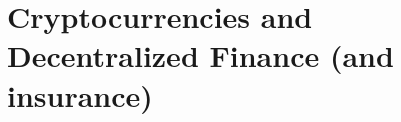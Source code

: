 \documentclass{beamer}
\begin{document}






\section{Cryptocurrencies and Decentralized Finance (and insurance)}
\end{document}
